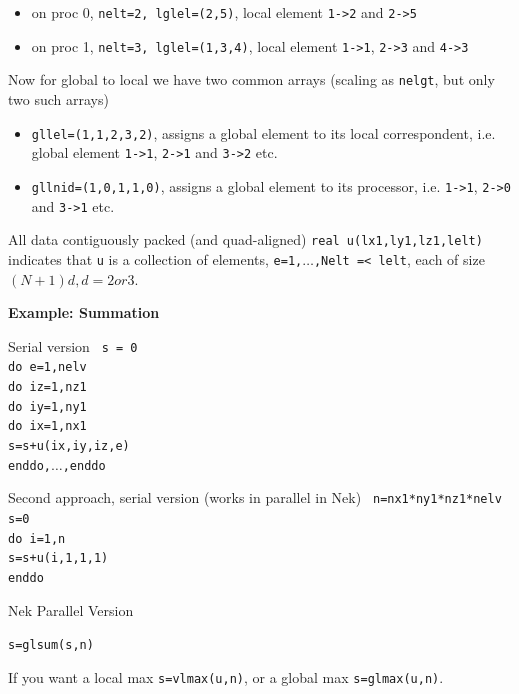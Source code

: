 \begin{itemize}
\item on proc 0, {\tt nelt=2, lglel=(2,5)}, local element {\tt 1->2} and {\tt 2->5}
\item on proc 1, {\tt nelt=3, lglel=(1,3,4)}, local element {\tt 1->1}, {\tt 2->3} and {\tt 4->3}
\end{itemize}
		  
Now for global to local we have two common arrays (scaling as {\tt nelgt}, but only two such arrays)

\begin{itemize}
\item {\tt gllel=(1,1,2,3,2)}, assigns a global element to its local correspondent, i.e. global element {\tt 1->1}, {\tt 2->1} and {\tt 3->2} etc.
\item {\tt gllnid=(1,0,1,1,0)}, assigns a global element to its processor, i.e. {\tt 1->1}, {\tt 2->0} and {\tt 3->1} etc.
\end{itemize}



All data contiguously packed (and quad-aligned) {\tt real  u(lx1,ly1,lz1,lelt)} indicates that {\tt u} is a collection of elements, {\tt e=1,\(\ldots\),Nelt =< lelt}, each of size \((N+1)d, d=2 or 3\).

\textbf{Example: Summation}

Serial version
{\tt
s = 0 \\
do e=1,nelv \\
do iz=1,nz1 \\
do iy=1,ny1 \\
do ix=1,nx1 \\
s=s+u(ix,iy,iz,e) \\
enddo,\(\ldots\),enddo}

Second approach, serial version (works in parallel in Nek)
{\tt
n=nx1*ny1*nz1*nelv \\
s=0 \\
do i=1,n \\
s=s+u(i,1,1,1) \\
enddo
}

Nek Parallel Version

{\tt s=glsum(s,n)}

If you want a local max {\tt s=vlmax(u,n)}, or a global max {\tt s=glmax(u,n)}.


